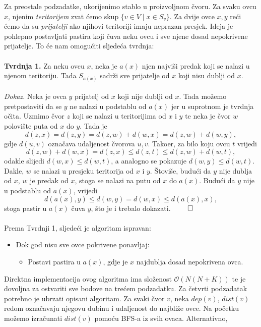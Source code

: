 Za preostale podzadatke, ukorijenimo stablo u proizvoljnom čvoru. Za svaku ovcu
$x$, njenim \textit{teritorijem} zvat ćemo skup $\{v \in V \mid x \in S_v\}$. Za
dvije ovce $x, y$ reći ćemo da su \textit{prijatelji} ako njihovi teritoriji
imaju neprazan presjek. Ideja je pohlepno postavljati pastira koji čuva neku
ovcu i sve njene dosad nepokrivene prijatelje. To će nam omogućiti sljedeća
tvrdnja:
\\\\
\textbf{Tvrdnja 1.} Za neku ovcu $x$, neka je $a(x)$ njen najviši predak koji
se nalazi u njenom teritoriju. Tada $S_{a(x)}$ sadrži sve prijatelje od $x$
koji nisu dublji od $x$.
\\\\
\textit{Dokaz.} Neka je ovca $y$ prijatelj od $x$ koji nije dublji od $x$. Tada
možemo pretpostaviti da se $y$ ne nalazi u podstablu od $a(x)$ jer u suprotnom
je tvrdnja očita. Uzmimo čvor $z$ koji se nalazi u teritorijima od $x$ i $y$ te
neka je čvor $w$ polovište puta od $x$ do $y$. Tada je
$$d(z, x) = d(z, y) = d(z, w) + d(w, x) = d(z, w) + d(w, y),$$ gdje $d(u, v)$
označava udaljenost čvorova $u, v$. Tako\dj er, za bilo koju ovcu $t$ vrijedi
$$d(z, w) + d(w, x) = d(z, x) \leq d(z, t) \leq d(z, w) + d(w, t),$$ odakle
slijedi $d(w, x) \leq d(w, t)$, a analogno se pokazuje $d(w, y) \leq d(w, t)$.
Dakle, $w$ se nalazi u presjeku teritorija od $x$ i $y$. Štoviše, budući da $y$
nije dublja od $x$, $w$ je predak od $x$, stoga se nalazi na putu od $x$ do
$a(x)$. Budući da $y$ nije u podstablu od $a(x)$, vrijedi $$d(a(x), y) \leq
d(w, y) = d(w, x) \leq d(a(x), x),$$ stoga pastir u $a(x)$ čuva $y$, što je i
trebalo dokazati. $\qed$
\\\\
Prema Tvrdnji 1, sljedeći je algoritam ispravan:
\begin{itemize}
    \item Dok god nisu sve ovce pokrivene ponavljaj:
    \begin{itemize}
        \item Postavi pastira u $a(x)$, gdje je $x$ najdublja dosad nepokrivena ovca.
    \end{itemize}
\end{itemize}
Direktna implementacija ovog algoritma ima složenost $\mathcal{O}(N(N + K))$ te
je dovoljna za ostvariti sve bodove na trećem podzadatku. Za četvrti podzadatak
potrebno je ubrzati opisani algoritam. Za svaki čvor $v$, neka $dep(v)$,
$dist(v)$ redom označavaju njegovu dubinu i udaljenost do najbliže ovce. Na
početku možemo izračunati $dist(v)$ pomoću BFS-a iz svih ovaca. Alternativno,
